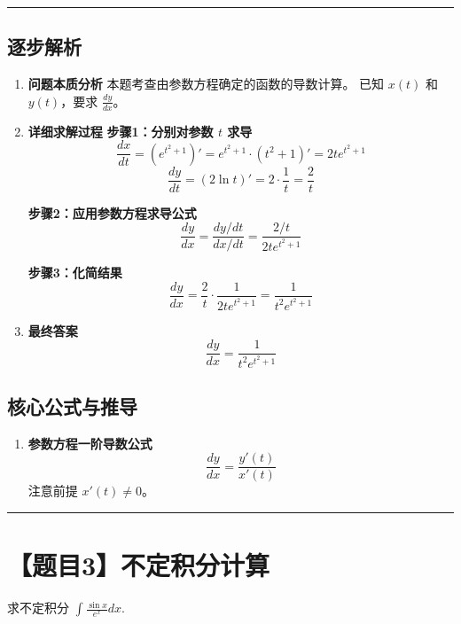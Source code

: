 \documentclass[12pt, a4paper]{article}
\newenvironment{redenv}{\color{red}}{}
\newenvironment{detailedanalysis}{%
    \color{red}
    \begin{enumerate}[label=\textbf{第\arabic*步：}, leftmargin=*, align=left, itemsep=1.5ex]
}{%
    \end{enumerate}
}
\newenvironment{formuladerivation}{%
    \begin{enumerate}[label={\textbf{公式\arabic*：}}, leftmargin=*, align=left]
}{%
    \end{enumerate}
}
\newcommand{\problemrule}{\noindent\rule{\textwidth}{1.5pt}\vspace{-0.8em}}
\newcommand{\analysisrule}{\noindent\rule{\textwidth}{0.8pt}\vspace{-0.8em}}
\begin{document}
\begin{redenv}
\analysisrule
\subsection*{逐步解析}

\begin{detailedanalysis}
\item \textbf{问题本质分析}
本题考查由参数方程确定的函数的导数计算。
已知 $x(t)$ 和 $y(t)$，要求 $\frac{dy}{dx}$。

\item \textbf{详细求解过程}
\textbf{步骤1：分别对参数 $t$ 求导}
\[ \frac{dx}{dt} = (e^{t^2+1})' = e^{t^2+1} \cdot (t^2+1)' = 2t e^{t^2+1} \]
\[ \frac{dy}{dt} = (2\ln t)' = 2 \cdot \frac{1}{t} = \frac{2}{t} \]

\textbf{步骤2：应用参数方程求导公式}
\[ \frac{dy}{dx} = \frac{dy/dt}{dx/dt} = \frac{2/t}{2t e^{t^2+1}} \]

\textbf{步骤3：化简结果}
\[ \frac{dy}{dx} = \frac{2}{t} \cdot \frac{1}{2t e^{t^2+1}} = \frac{1}{t^2 e^{t^2+1}} \]

\item \textbf{最终答案}
\[ \frac{dy}{dx} = \frac{1}{t^2 e^{t^2+1}} \]
\end{detailedanalysis}

\subsection*{核心公式与推导}
\begin{formuladerivation}
\item \textbf{参数方程一阶导数公式}
\[ \frac{dy}{dx} = \frac{y'(t)}{x'(t)} \]
注意前提 $x'(t) \neq 0$。
\end{formuladerivation}
\end{redenv}


\problemrule
\section*{【题目3】不定积分计算}
求不定积分 $\int \frac{\sin x}{e^x} dx$.
\end{document}
